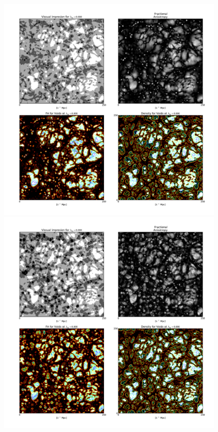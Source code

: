 \documentclass[a4,useAMS,usenatbib,usegraphicx]{latex/mn2e}
\begin{document}
\begin{flushleft}
\begin{figure}
\centering

  \includegraphics[trim = 25mm 200mm 18mm 15mm, clip, keepaspectratio=true,
  width=0.5\textheight]{./figures/cosmicweb_FA_Tweb(null).pdf}
  
  \includegraphics[trim = 25mm 200mm 18mm 15mm, clip, keepaspectratio=true,
  width=0.5\textheight]{./figures/cosmicweb_FA_Vweb(null).pdf}  
  

\end{figure}
\end{flushleft}
\end{document}
